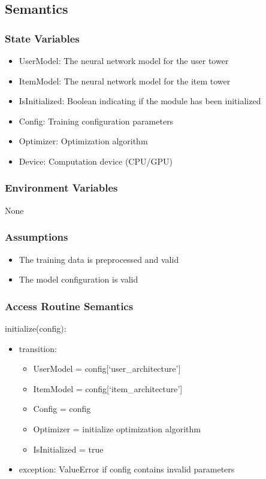 \documentclass[12pt, titlepage]{article}
\begin{document}
\subsection{Semantics}

\subsubsection{State Variables}
\begin{itemize}
  \item UserModel: The neural network model for the user tower
  \item ItemModel: The neural network model for the item tower
  \item IsInitialized: Boolean indicating if the module has been initialized
  \item Config: Training configuration parameters
  \item Optimizer: Optimization algorithm
  \item Device: Computation device (CPU/GPU)
\end{itemize}

\subsubsection{Environment Variables}

None

\subsubsection{Assumptions}

\begin{itemize}
  \item The training data is preprocessed and valid
  \item The model configuration is valid
\end{itemize}

\subsubsection{Access Routine Semantics}

\noindent initialize(config):
\begin{itemize}
\item transition:
\begin{itemize}
  \item UserModel = config[`user\_architecture']
  \item ItemModel = config[`item\_architecture']
  \item Config = config
  \item Optimizer = initialize optimization algorithm
  \item IsInitialized = true
\end{itemize}
\item exception: ValueError if config contains invalid parameters
\end{itemize}
\end{document}
